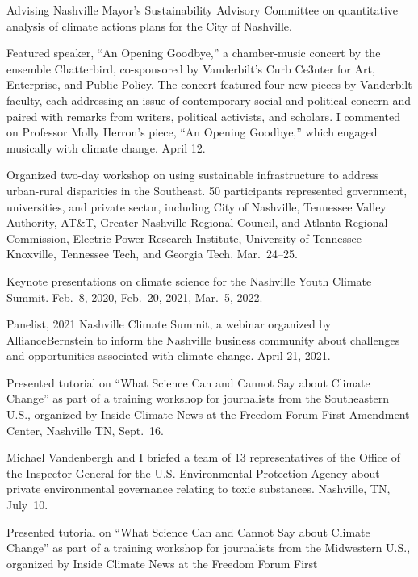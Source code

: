 \item[2020--present] Advising Nashville Mayor's Sustainability Advisory
  Committee on quantitative analysis of climate actions plans for the City of
  Nashville.
\item[2023] Featured speaker, ``An Opening Goodbye,'' a chamber-music concert
  by the ensemble Chatterbird, co-sponsored by Vanderbilt's Curb Ce3nter for 
  Art, Enterprise, and Public Policy. The concert featured four new pieces by
  Vanderbilt faculty, each addressing an issue of contemporary social and political
  concern and paired with remarks from writers, political activists, and scholars.
  I commented on Professor Molly Herron's piece, ``An Opening Goodbye,'' 
  which engaged musically with climate change.  April 12.
\item[2022] Organized two-day workshop on using sustainable infrastructure to
  address urban-rural disparities in the Southeast. 50 participants represented
  government, universities, and private sector, including City of Nashville,
  Tennessee Valley Authority, AT\&T, Greater Nashville Regional Council,
  and Atlanta Regional Commission, Electric Power Research Institute,
  University of Tennessee Knoxville, Tennessee Tech, and Georgia Tech.
  Mar.~24--25.
\item[2020--2022] Keynote presentations on climate science for the Nashville
Youth Climate Summit. Feb.~8, 2020, Feb.~20, 2021, Mar.~5, 2022.
\item[2021] Panelist, 2021 Nashville Climate Summit, a webinar organized by
 AllianceBernstein to inform the Nashville business community about
 challenges and opportunities associated with climate change. April 21, 2021.
\item[2019] Presented tutorial on ``What Science Can and Cannot Say about
  Climate Change'' as part of a training workshop for journalists from the
  Southeastern U.S., organized by Inside Climate News at the Freedom Forum
  First Amendment Center, Nashville TN, Sept.~16.
\item[2019] Michael Vandenbergh and I briefed a team of 13 representatives of
  the Office of the Inspector General for the U.S. Environmental Protection
  Agency about private environmental governance relating to toxic substances.
  Nashville, TN, July~10.
\item[2019] Presented tutorial on ``What Science Can and Cannot Say about
  Climate Change'' as part of a training workshop for journalists from the
  Midwestern U.S., organized by Inside Climate News at the Freedom Forum First
